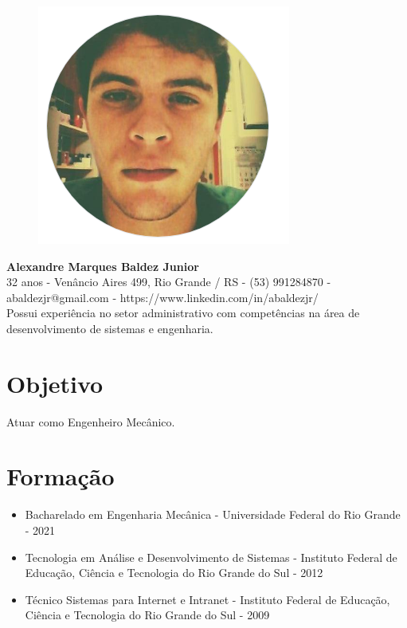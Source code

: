 \documentclass[11pt,oneside,a4paper]{article}
\begin{document}
    \thispagestyle{empty}
    \begin{figure}
        \centering
        \includegraphics[scale = 0.3]{img/perfil-red.png}        
    \end{figure}
    \begin{flushleft}
    \textbf{\Large {Alexandre Marques Baldez Junior}}\\
    \vspace{0.5cm}
    32 anos - Venâncio Aires 499, Rio Grande / RS - (53) 991284870 - abaldezjr@gmail.com - https://www.linkedin.com/in/abaldezjr/\\
    \vspace{0.5cm}
    Possui experiência no setor administrativo com competências na área de desenvolvimento de sistemas e engenharia.\\
    \end{flushleft}    
    \section*{Objetivo}
    Atuar como Engenheiro Mecânico.
    \section*{Formação}
    \begin{itemize}
        \item Bacharelado em Engenharia Mecânica - Universidade Federal do Rio Grande - 2021
        \item Tecnologia em Análise e Desenvolvimento de Sistemas - Instituto Federal de Educação, Ciência e Tecnologia do Rio Grande do Sul - 2012
        \item Técnico Sistemas para Internet e Intranet - Instituto Federal de Educação, Ciência e Tecnologia do Rio Grande do Sul - 2009
    \end{itemize}
\end{document}
